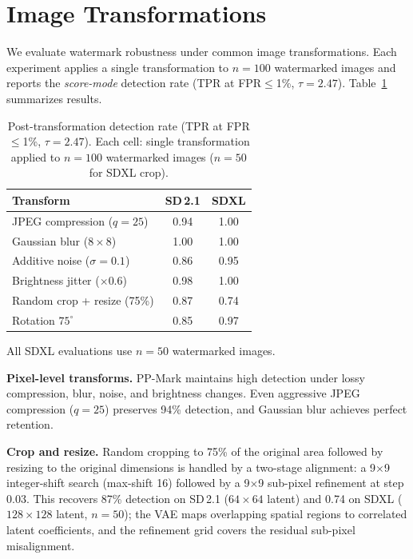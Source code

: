 \documentclass{article}
\theoremstyle{plain}
\theoremstyle{definition}
\theoremstyle{remark}
\begin{document}
\section{Image Transformations} \label{Image Transformations}

We evaluate watermark robustness under common image transformations.
Each experiment applies a single transformation to $n{=}100$ watermarked images
and reports the \emph{score-mode} detection rate (TPR at FPR${\leq}$1\%,
$\tau{=}2.47$).
Table~\ref{tab:image-transforms} summarizes results.

\begin{table}[H]
\centering
\caption{Post-transformation detection rate (TPR at FPR${\leq}$1\%, $\tau{=}2.47$).
Each cell: single transformation applied to $n{=}100$ watermarked images
($n{=}50$ for SDXL crop).}
\label{tab:image-transforms}
\small
\begin{tabular}{lcc}
\toprule
Transform & SD\,2.1 & SDXL \\
\midrule
JPEG compression ($q{=}25$) & 0.94 & 1.00 \\
Gaussian blur ($8{\times}8$) & 1.00 & 1.00 \\
Additive noise ($\sigma{=}0.1$) & 0.86 & 0.95 \\
Brightness jitter (${\times}0.6$) & 0.98 & 1.00 \\
\midrule
Random crop + resize (75\%) & 0.87 & 0.74 \\
Rotation $75^\circ$ & 0.85 & 0.97 \\
\bottomrule
\end{tabular}

\vspace{0.3em}
{\footnotesize All SDXL evaluations use $n{=}50$ watermarked images.}
\end{table}

\textbf{Pixel-level transforms.}\enspace
PP-Mark maintains high detection under lossy compression, blur, noise, and brightness changes.
Even aggressive JPEG compression ($q{=}25$) preserves 94\% detection, and Gaussian blur achieves perfect retention.

\textbf{Crop and resize.}\enspace
Random cropping to 75\% of the original area followed by resizing to the original dimensions
is handled by a two-stage alignment: a 9$\times$9 integer-shift search (max-shift 16)
followed by a 9$\times$9 sub-pixel refinement at step 0.03.
This recovers 87\% detection on SD\,2.1 ($64{\times}64$ latent) and 0.74 on SDXL
($128{\times}128$ latent, $n{=}50$);
the VAE maps overlapping spatial regions to correlated latent coefficients,
and the refinement grid covers the residual sub-pixel misalignment.
\end{document}
